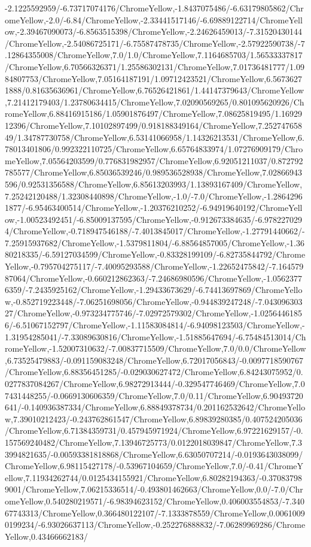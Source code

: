 {\begin{tikzternal}
{-2.1225592959/-6.73717074176/ChromeYellow,-1.8437075486/-6.63179805862/ChromeYellow,-2.0/-6.84/ChromeYellow,-2.33441517146/-6.69889122714/ChromeYellow,-2.39467090073/-6.8563515398/ChromeYellow,-2.24626459013/-7.31520430144/ChromeYellow,-2.54086725171/-6.75587478735/ChromeYellow,-2.57922590738/-7.12864355008/ChromeYellow,7.0/1.0/ChromeYellow,7.1164685703/1.56533337817/ChromeYellow,6.70566326371/1.25586302131/ChromeYellow,7.01736481777/1.0984807753/ChromeYellow,7.05164187191/1.09712423521/ChromeYellow,6.56736271888/0.81635636961/ChromeYellow,6.76526421861/1.44147379643/ChromeYellow,7.21412179403/1.23780634415/ChromeYellow,7.02090569265/0.801095620926/ChromeYellow,6.88416915186/1.05901876497/ChromeYellow,7.08625819495/1.1692912396/ChromeYellow,7.10102897499/0.918188349164/ChromeYellow,7.25274765849/1.34787730758/ChromeYellow,6.53141066958/1.14326213531/ChromeYellow,6.78013401806/0.992322110725/ChromeYellow,6.65764833974/1.07276909179/ChromeYellow,7.05564203599/0.776831982957/ChromeYellow,6.92051211037/0.872792785577/ChromeYellow,6.85036539246/0.989536528938/ChromeYellow,7.02866943596/0.92531356588/ChromeYellow,6.85613203993/1.13893167409/ChromeYellow,7.25242120488/1.32308440898/ChromeYellow,-1.0/-7.0/ChromeYellow,-1.28642961877/-6.95463400514/ChromeYellow,-1.20376210252/-6.94919640192/ChromeYellow,-1.00523492451/-6.85009137595/ChromeYellow,-0.912673384635/-6.9782270294/ChromeYellow,-0.718947546188/-7.4013845017/ChromeYellow,-1.27791440662/-7.25915937682/ChromeYellow,-1.5379811804/-6.88564857005/ChromeYellow,-1.3680218335/-6.59127034599/ChromeYellow,-0.83328199109/-6.82735844792/ChromeYellow,-0.795704275117/-7.40095293588/ChromeYellow,-1.22652475842/-7.16457987064/ChromeYellow,-0.660212862363/-7.24686980596/ChromeYellow,-1.05623776359/-7.2435925162/ChromeYellow,-1.29433673629/-6.74413697869/ChromeYellow,-0.852719223448/-7.06251698056/ChromeYellow,-0.944839247248/-7.04309630327/ChromeYellow,-0.973234775746/-7.02972579302/ChromeYellow,-1.02564461856/-6.51067152797/ChromeYellow,-1.11583084814/-6.94098123503/ChromeYellow,-1.31954285041/-7.33089630816/ChromeYellow,-1.51885647694/-6.75484513014/ChromeYellow,-1.52007310632/-7.00837715509/ChromeYellow,7.0/0.0/ChromeYellow,6.73525479883/-0.091159083248/ChromeYellow,6.72017056843/-0.0097718590767/ChromeYellow,6.88356451285/-0.029030627472/ChromeYellow,6.84243075952/0.0277837084267/ChromeYellow,6.98272913444/-0.329547746469/ChromeYellow,7.07431448255/-0.0669130606359/ChromeYellow,7.0/0.11/ChromeYellow,6.90493720641/-0.140936387334/ChromeYellow,6.88849378734/0.201162532642/ChromeYellow,7.39010212423/-0.243762861547/ChromeYellow,6.89839280385/0.407524205036/ChromeYellow,6.71384359731/0.457945971924/ChromeYellow,6.97221629157/-0.157569240482/ChromeYellow,7.13946725773/0.0122018039847/ChromeYellow,7.33994821635/-0.00593381818868/ChromeYellow,6.63050707214/-0.0193643038099/ChromeYellow,6.98115427178/-0.53967104659/ChromeYellow,7.0/-0.41/ChromeYellow,7.11934262744/0.0125434155921/ChromeYellow,6.80282194363/-0.370837989001/ChromeYellow,7.06215336514/-0.493801462663/ChromeYellow,0.0/-7.0/ChromeYellow,0.540280219571/-6.98394623152/ChromeYellow,0.406003554853/-7.34067743313/ChromeYellow,0.366480122107/-7.1333878559/ChromeYellow,0.00610090199234/-6.93026637113/ChromeYellow,-0.252276888832/-7.06289969286/ChromeYellow,0.43466662183/}
\end{tikzternal}}
